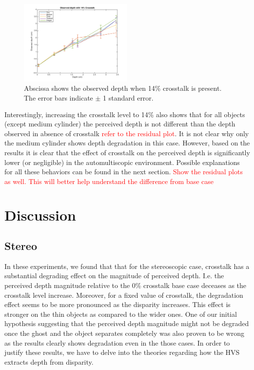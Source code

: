 \begin{figure}[H]
\centering
    \includegraphics[width=0.5\textwidth]{./Template_Figures/a_crosstalk_14}
    \caption{Abscissa shows the observed depth when 14\% crosstalk is present. The error bars indicate $\pm$ 1 standard error.\label{fig:a_crosstalk_14}}
\end{figure}
Interestingly, increasing the crosstalk level to 14\% also shows that for all objects (except medium cylinder) the perceived depth is not different than the depth observed in absence of crosstalk \textcolor{red}{refer to the residual plot}. It is not clear why only the medium cylinder shows depth degradation in this case. However, based on the results it is clear that the effect of crosstalk on the perceived depth is significantly lower (or negligible) in the automultiscopic environment. Possible explanations for all these behaviors can be found in the next section.
\textcolor{red}{Show the residual plots as well. This will better help understand the difference from base case}

\section {Discussion}
\subsection{Stereo}
In these experiments, we found that that for the stereoscopic case, crosstalk has a substantial degrading effect on the magnitude of perceived depth. I.e. the perceived depth magnitude relative to the 0\% crosstalk base case deceases as the crosstalk level increase. Moreover, for a fixed value of crosstalk, the degradation effect seems to be more pronounced as the disparity increases. This effect is stronger on the thin objects as compared to the wider ones. One of our initial hypothesis suggesting that the perceived depth magnitude might not be degraded once the ghost and the object separates completely was also proven to be wrong as the results clearly shows degradation even in the those cases. In order to justify these results, we have to delve into the theories regarding how the HVS extracts depth from disparity.

